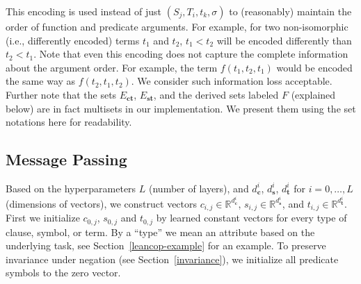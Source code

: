 \documentclass{ecai}
\newcommand{\R}{\mathbb{R}}
\begin{document}
This encoding is used instead of just $(S_j,T_i,t_k,\sigma)$ %
to (reasonably) maintain the order of function and predicate arguments.
For example, for two non-isomorphic (i.e., differently encoded) terms $t_1$ and $t_2$, $t_1<t_2$ will be encoded differently than $t_2<t_1$. %
Note that even this encoding does not capture the complete information about the argument order.
For example, the term $f(t_1,t_2,t_1)$ would be encoded the same way as $f(t_2,t_1,t_2)$. 
We consider such information loss acceptable.
%
Further note that the sets $E_{\mathbf{ct}}$, $E_{\mathbf{st}}$, and the derived sets labeled $F$ (explained below) are in fact multisets in our implementation. We present them using the set notations here for readability. %

\subsection{Message Passing}
\label{messagepassing}
Based on the hyperparameters $L$ (number of layers), and $d_{\mathbf c}^i$,
$d_{\mathbf s}^i$, $d_{\mathbf t}^i$ for $i=0,\ldots,L$ (dimensions of
vectors), we construct vectors
$c_{i,j}\in \R^{d^i_{\mathbf c}}$, $s_{i,j}\in \R^{d^i_{\mathbf s}}$,
and $t_{i,j}\in \R^{d^i_{\mathbf t}}$. First we initialize
$c_{0,j}$, $s_{0,j}$ and $t_{0,j}$ by learned constant vectors for every type
of clause, symbol, or term. By a ``type'' we mean 
an attribute based on the underlying task, see
Section~\ref{leancop-example} for an example. To preserve invariance
under negation (see Section~\ref{invariance}), we initialize all
predicate symbols to the zero vector.
\end{document}
